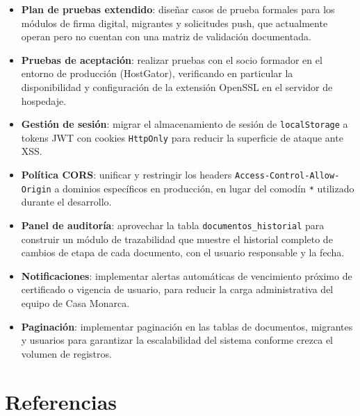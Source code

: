 \documentclass[10pt,letterpaper]{report}
\begin{document}
\begin{itemize}
  \item \textbf{Plan de pruebas extendido}: diseñar casos de prueba formales para los módulos de firma digital, migrantes y solicitudes push, que actualmente operan pero no cuentan con una matriz de validación documentada.
  \item \textbf{Pruebas de aceptación}: realizar pruebas con el socio formador en el entorno de producción (HostGator), verificando en particular la disponibilidad y configuración de la extensión OpenSSL en el servidor de hospedaje.
  \item \textbf{Gestión de sesión}: migrar el almacenamiento de sesión de \texttt{localStorage} a tokens JWT con cookies \texttt{HttpOnly} para reducir la superficie de ataque ante XSS.
  \item \textbf{Política CORS}: unificar y restringir los headers \texttt{Access-Control-Allow-Origin} a dominios específicos en producción, en lugar del comodín \texttt{*} utilizado durante el desarrollo.
  \item \textbf{Panel de auditoría}: aprovechar la tabla \texttt{documentos\_historial} para construir un módulo de trazabilidad que muestre el historial completo de cambios de etapa de cada documento, con el usuario responsable y la fecha.
  \item \textbf{Notificaciones}: implementar alertas automáticas de vencimiento próximo de certificado o vigencia de usuario, para reducir la carga administrativa del equipo de Casa Monarca.
  \item \textbf{Paginación}: implementar paginación en las tablas de documentos, migrantes y usuarios para garantizar la escalabilidad del sistema conforme crezca el volumen de registros.
\end{itemize}

\chapter*{Referencias}
\end{document}
